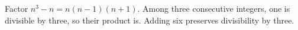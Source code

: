 Factor $n^3-n=n(n-1)(n+1)$. Among three consecutive integers, one is divisible by three, so their product is. Adding six preserves divisibility by three.
